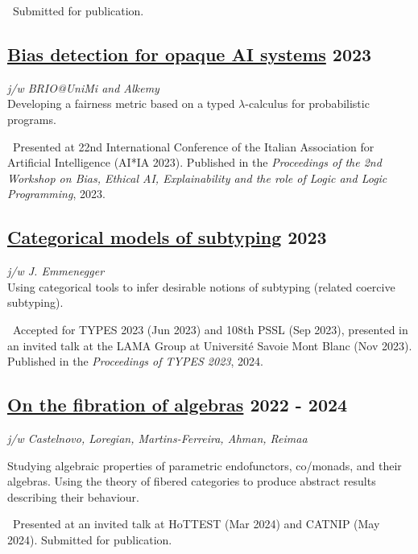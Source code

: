 \documentclass[a4paper,9pt]{article}
\begin{document}
\, Submitted for publication.

\subsection*{\href{https://ceur-ws.org/Vol-3615/paper4.pdf}{Bias detection for opaque AI systems} \hfill 2023}
\textit{j/w BRIO@UniMi and Alkemy}\\
Developing a fairness metric based on a typed $\lambda$-calculus for probabilistic programs.

\, Presented at 22nd International Conference of the Italian Association for Artificial Intelligence (AI*IA 2023). Published in the \emph{Proceedings of the 2nd Workshop on Bias, Ethical AI, Explainability and the role of Logic and Logic Programming}, 2023.

\subsection*{\href{https://drops.dagstuhl.de/entities/document/10.4230/LIPIcs.TYPES.2023.3}{Categorical models of subtyping} \hfill 2023}
\textit{j/w J. Emmenegger}\\
Using categorical tools to infer desirable notions of subtyping (related coercive subtyping).

\, Accepted for TYPES 2023 (Jun 2023) and 108th PSSL (Sep 2023), presented in an invited talk at the LAMA Group at Université Savoie Mont Blanc (Nov 2023). Published in the \emph{Proceedings of TYPES 2023}, 2024.

\subsection*{\href{https://arxiv.org/abs/2408.16581}{On the fibration of algebras} \hfill 2022 - 2024}
\begin{flushright}
\vspace{-.8em}
\textit{j/w Castelnovo, Loregian, Martins-Ferreira, Ahman, Reimaa}
\end{flushright}
\vspace{-.5em}
Studying algebraic properties of parametric endofunctors, co/monads, and their algebras. Using the theory of fibered categories to produce abstract results describing their behaviour.

\, Presented at an invited talk at HoTTEST (Mar 2024) and CATNIP (May 2024). Submitted for publication.
\end{document}

